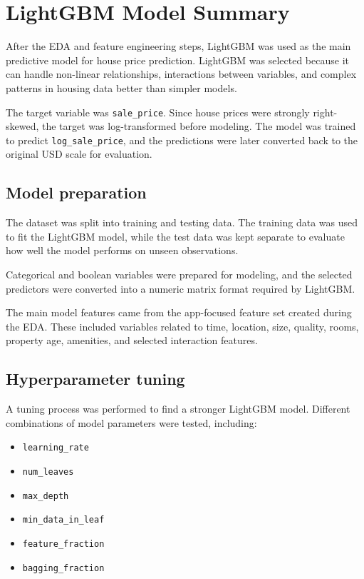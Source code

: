 \documentclass[
  english,
  letterpaper,
  DIV=11,
  numbers=noendperiod]{scrreprt}
\providecommand{\tightlist}{%
  \setlength{\itemsep}{0pt}\setlength{\parskip}{0pt}}
\begin{document}
\section{LightGBM Model Summary}\label{lightgbm-model-summary}

After the EDA and feature engineering steps, LightGBM was used as the
main predictive model for house price prediction. LightGBM was selected
because it can handle non-linear relationships, interactions between
variables, and complex patterns in housing data better than simpler
models.

The target variable was \texttt{sale\_price}. Since house prices were
strongly right-skewed, the target was log-transformed before modeling.
The model was trained to predict \texttt{log\_sale\_price}, and the
predictions were later converted back to the original USD scale for
evaluation.

\subsection{Model preparation}\label{model-preparation}

The dataset was split into training and testing data. The training data
was used to fit the LightGBM model, while the test data was kept
separate to evaluate how well the model performs on unseen observations.

Categorical and boolean variables were prepared for modeling, and the
selected predictors were converted into a numeric matrix format required
by LightGBM.

The main model features came from the app-focused feature set created
during the EDA. These included variables related to time, location,
size, quality, rooms, property age, amenities, and selected interaction
features.

\subsection{Hyperparameter tuning}\label{hyperparameter-tuning}

A tuning process was performed to find a stronger LightGBM model.
Different combinations of model parameters were tested, including:

\begin{itemize}
\tightlist
\item
  \texttt{learning\_rate}
\item
  \texttt{num\_leaves}
\item
  \texttt{max\_depth}
\item
  \texttt{min\_data\_in\_leaf}
\item
  \texttt{feature\_fraction}
\item
  \texttt{bagging\_fraction}
\end{itemize}
\end{document}
